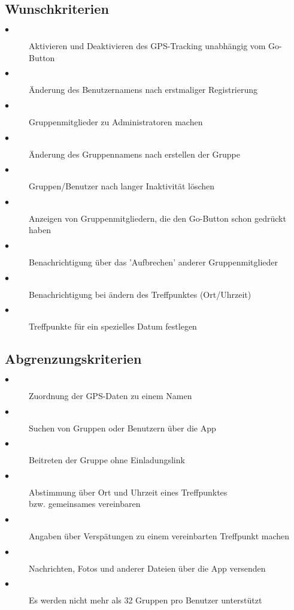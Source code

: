 \documentclass{article}
\begin{document}
\subsection{Wunschkriterien}
\begin{description}
\item[$\bullet$] Aktivieren und Deaktivieren des GPS-Tracking unabhängig vom Go-Button
\item[$\bullet$] Änderung des Benutzernamens nach erstmaliger Registrierung
\item[$\bullet$] Gruppenmitglieder zu Administratoren machen
\item[$\bullet$] Änderung des Gruppennamens nach erstellen der Gruppe
\item[$\bullet$] Gruppen/Benutzer nach langer Inaktivität löschen
\item[$\bullet$] Anzeigen von Gruppenmitgliedern, die den Go-Button schon gedrückt haben
\item[$\bullet$] Benachrichtigung über das 'Aufbrechen' anderer Gruppenmitglieder
\item[$\bullet$] Benachrichtigung bei ändern des Treffpunktes (Ort/Uhrzeit)
\item[$\bullet$] Treffpunkte für ein spezielles Datum festlegen
\end{description}
\subsection{Abgrenzungskriterien}
\begin{description}
\item[$\bullet$] Zuordnung der GPS-Daten zu einem Namen
\item[$\bullet$] Suchen von Gruppen oder Benutzern über die App
\item[$\bullet$] Beitreten der Gruppe ohne Einladungslink
\item[$\bullet$] Abstimmung über Ort und Uhrzeit eines Treffpunktes\\bzw. gemeinsames vereinbaren
\item[$\bullet$] Angaben über Verspätungen zu einem vereinbarten Treffpunkt machen
\item[$\bullet$] Nachrichten, Fotos und anderer Dateien über die App versenden
\item[$\bullet$] Es werden nicht mehr als 32 Gruppen pro Benutzer unterstützt
\end{description}
\end{document}
